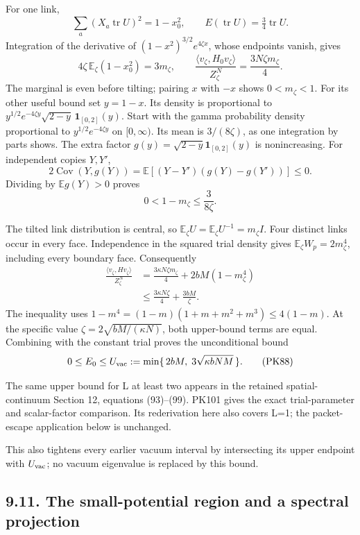 \documentclass[11pt]{article}
\begin{document}
For one link,
\[
 \sum_a(X_a\operatorname{tr}U)^2=1-x_0^2,\qquad
 E(\operatorname{tr}U)=\tfrac34\operatorname{tr}U .
\]
Integration of the derivative of
\((1-x^2)^{3/2}e^{4\zeta x}\), whose endpoints vanish, gives
\[
 4\zeta\,\mathbb E_\zeta(1-x_0^2)=3m_\zeta,\qquad
 \frac{\langle v_\zeta,H_0v_\zeta\rangle}{Z_\zeta^N}
 =\frac{3N\zeta m_\zeta}{4}.
 \tag{PK85}
\]
The marginal is even before tilting; pairing \(x\) with \(-x\)
shows \(0<m_\zeta<1\). For its other useful bound set \(y=1-x\).
Its density is proportional to
\(y^{1/2}e^{-4\zeta y}\sqrt{2-y}\,\mathbf1_{[0,2]}(y)\).
Start with the gamma probability density proportional to
\(y^{1/2}e^{-4\zeta y}\) on \([0,\infty)\). Its mean is
\(3/(8\zeta)\), as one integration by parts shows. The extra factor
\(g(y)=\sqrt{2-y}\mathbf1_{[0,2]}(y)\) is nonincreasing.
For independent copies \(Y,Y'\),
\[
 2\operatorname{Cov}(Y,g(Y))
 =\mathbb E[(Y-Y')(g(Y)-g(Y'))]\le0 .
 \]
Dividing by \(\mathbb E g(Y)>0\) proves
\[
 0<1-m_\zeta\le\frac3{8\zeta}.
 \tag{PK86}
\]

The tilted link distribution is central, so
\(\mathbb E_\zeta U=\mathbb E_\zeta U^{-1}=m_\zeta I\).
Four distinct links occur in every face. Independence in the squared
trial density gives \(\mathbb E_\zeta W_p=2m_\zeta^4\), including
every boundary face. Consequently
\[
 \begin{split}
 \frac{\langle v_\zeta,Hv_\zeta\rangle}{Z_\zeta^N}
 &=\frac{3\kappa N\zeta m_\zeta}{4}
       +2bM(1-m_\zeta^4)\\
 &\le\frac{3\kappa N\zeta}{4}+\frac{3bM}{\zeta}.
 \end{split}\tag{PK87}
\]
The inequality uses
\(1-m^4=(1-m)(1+m+m^2+m^3)\le4(1-m)\).
At the specific value
\(\zeta=2\sqrt{bM/(\kappa N)}\), both upper-bound terms are equal.
Combining with the constant trial proves the unconditional bound
\[
 0\le E_0\le U_{\rm vac}:=
 \min\{\,2bM,\;3\sqrt{\kappa bNM}\,\}.
 \tag{PK88}
\]

The same upper bound for L at least two appears in the retained
spatial-continuum Section 12, equations (93)–(99). PK101 gives the
exact trial-parameter and scalar-factor comparison. Its rederivation
here also covers L=1; the packet-escape application below is unchanged.

This also tightens every earlier vacuum interval by intersecting its
upper endpoint with \(U_{\rm vac}\); no vacuum eigenvalue is replaced
by this bound.

\subsection*{9.11. The small-potential region and a spectral projection}
\end{document}
